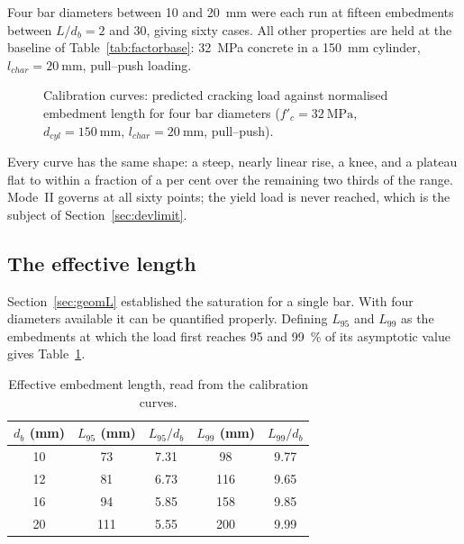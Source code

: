 Four bar diameters between \SI{10}{} and \SI{20}{\milli\metre} were each run
at fifteen embedments between $L/d_b = 2$ and \num{30}, giving sixty cases.
All other properties are held at the baseline of
Table~\ref{tab:factorbase}: \SI{32}{\mega\pascal} concrete in a
\SI{150}{\milli\metre} cylinder, $l_{char} = \SI{20}{\milli\metre}$,
pull--push loading.

\begin{figure}[H]
\centering
\caption{Calibration curves: predicted cracking load against normalised
         embedment length for four bar diameters
         ($f'_c = \SI{32}{\mega\pascal}$, $d_{cyl} = \SI{150}{\milli\metre}$,
         $l_{char} = \SI{20}{\milli\metre}$, pull--push).}
\label{fig:calcurves}
\end{figure}

Every curve has the same shape: a steep, nearly linear rise, a knee, and a
plateau flat to within a fraction of a per cent over the remaining two
thirds of the range. Mode~II governs at all sixty points; the yield load is
never reached, which is the subject of Section~\ref{sec:devlimit}.

\subsection{The effective length}

Section~\ref{sec:geomL} established the saturation for a single bar.
With four diameters available it can be quantified properly. Defining
$L_{95}$ and $L_{99}$ as the embedments at which the load first reaches
\SI{95}{} and \SI{99}{\percent} of its asymptotic value gives
Table~\ref{tab:efflength}.

\begin{table}[H]
\centering
\caption{Effective embedment length, read from the calibration curves.}
\label{tab:efflength}
\small
\begin{tabular*}{\linewidth}{@{\extracolsep{\fill}}ccccc@{}}
\hline
$d_b$ (mm) & $L_{95}$ (mm) & $L_{95}/d_b$ & $L_{99}$ (mm) & $L_{99}/d_b$ \\
\hline
10 & 73  & 7.31 & 98  & 9.77 \\
12 & 81  & 6.73 & 116 & 9.65 \\
16 & 94  & 5.85 & 158 & 9.85 \\
20 & 111 & 5.55 & 200 & 9.99 \\
\hline
\end{tabular*}
\end{table}

